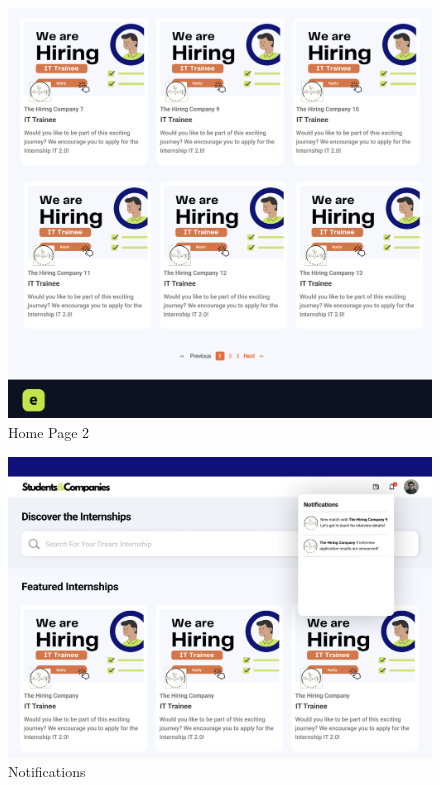 \documentclass{article}
\begin{document}
\begin{figure}[H]
    \centering
    \includegraphics[scale = 0.40]{figures/Home Page 2.png}
    \caption{Home Page 2}
     \centering
\end{figure}

\begin{figure}[H]
    \centering
    \includegraphics[scale = 0.40]{figures/Notifications.png}
    \caption{Notifications}
     \centering
\end{figure}
\end{document}
